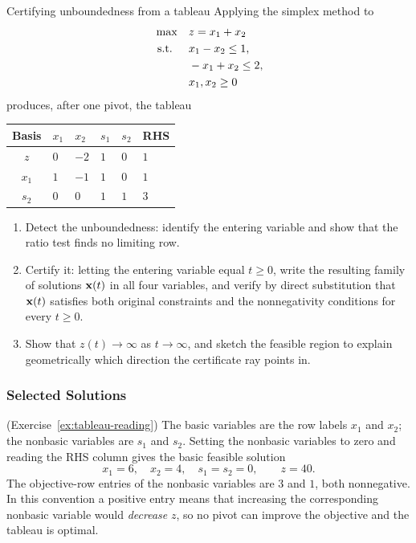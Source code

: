 \begin{ex}{Certifying unboundedness from a tableau}{}
\label{ex:tableau-unbounded-certificate}
 Applying the simplex method to
\[
\begin{aligned}
\max\quad & z = x_1 + x_2\\
\text{ s.t. }\quad  & x_1 - x_2  \le 1,\\
          & -x_1 + x_2 \le 2,\\
          & x_1, x_2 \ge 0
\end{aligned}
\]
produces, after one pivot, the tableau
\begin{center}
\renewcommand{\arraystretch}{1.3}
\begin{tabular}{c|ZZZZ|Z}
\toprule
Basis & $x_1$ & $x_2$ & $s_1$ & $s_2$ & RHS\\
\midrule
$z$   & $0$ & $-2$ & $1$ & $0$ & $1$\\
\midrule
$x_1$ & $1$ & $-1$ & $1$ & $0$ & $1$\\
$s_2$ & $0$ & $0$  & $1$ & $1$ & $3$\\
\bottomrule
\end{tabular}
\end{center}
\begin{enumerate}
    \item Detect the unboundedness: identify the entering variable and show that the ratio test finds no limiting row.
    \item Certify it: letting the entering variable equal $t \ge 0$, write the resulting family of solutions $\mathbf{x}(t)$ in all four variables, and verify by direct substitution that $\mathbf{x}(t)$ satisfies both original constraints and the nonnegativity conditions for every $t \ge 0$.
    \item Show that $z(t) \to \infty$ as $t \to \infty$, and sketch the feasible region to explain geometrically which direction the certificate ray points in.
\end{enumerate}
\end{ex}

\subsubsection*{Selected Solutions}

\begin{solution}(Exercise~\ref{ex:tableau-reading})
The basic variables are the row labels $x_1$ and $x_2$; the nonbasic variables are $s_1$ and $s_2$.  Setting the nonbasic variables to zero and reading the RHS column gives the basic feasible solution
\[
x_1 = 6, \quad x_2 = 4, \quad s_1 = s_2 = 0, \qquad z = 40.
\]
The objective-row entries of the nonbasic variables are $3$ and $1$, both nonnegative.  In this convention a positive entry means that increasing the corresponding nonbasic variable would \emph{decrease} $z$, so no pivot can improve the objective and the tableau is optimal.
\end{solution}

